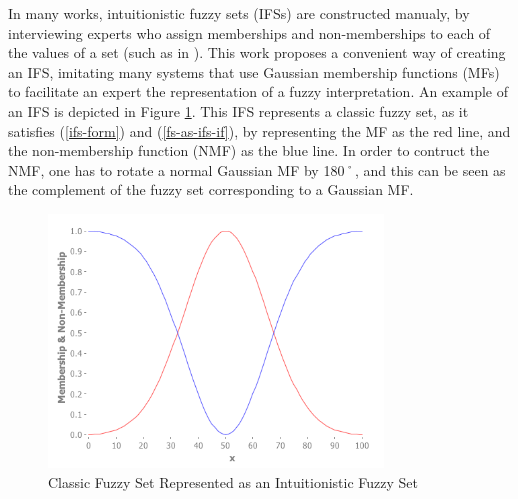 \documentclass[conference]{IEEEtran}
\begin{document}



In many works, intuitionistic fuzzy sets (IFSs) are constructed manualy,
by interviewing experts who assign memberships and
non-memberships to each of the values of a set (such as in %
\cite{davarzani2013novel}). This work proposes a convenient way of
creating an IFS, imitating many systems that use Gaussian
membership functions (MFs) to facilitate an expert the representation of a
fuzzy interpretation. An example of an IFS is depicted in
Figure \ref{fs-as-ifs}. This IFS represents a classic fuzzy set, as it
satisfies (\ref{ifs-form}) and (\ref{fs-as-ifs-if}), by representing
the MF as the red line, and the non-membership
function (NMF) as the blue line. In order to contruct the NMF, one has
to rotate a normal Gaussian MF by 180˚, and this can be seen as the
complement of the fuzzy set corresponding to a Gaussian MF.

\begin{figure}[!t]
  \centering
  \includegraphics[width=3.5in]{fs-as-ifs}
  \caption{Classic Fuzzy Set Represented as an Intuitionistic Fuzzy Set}
  \label{fs-as-ifs}
\end{figure}
\end{document}
